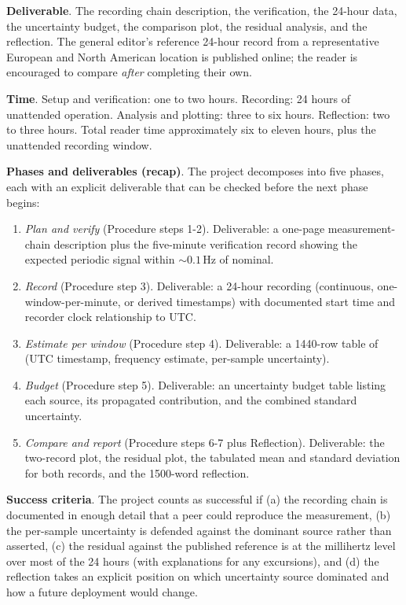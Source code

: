 \begin{project}
\textbf{Deliverable}. The recording chain description, the
verification, the 24-hour data, the uncertainty budget, the
comparison plot, the residual analysis, and the reflection. The
general editor's reference 24-hour record from a representative
European and North American location is published online; the
reader is encouraged to compare \emph{after} completing their own.

\textbf{Time}. Setup and verification: one to two hours. Recording:
24 hours of unattended operation. Analysis and plotting: three to
six hours. Reflection: two to three hours. Total reader time
approximately six to eleven hours, plus the unattended recording
window.

\textbf{Phases and deliverables (recap)}. The project decomposes
into five phases, each with an explicit deliverable that can be
checked before the next phase begins:

\begin{enumerate}[leftmargin=*]
  \item \emph{Plan and verify} (Procedure steps 1-2). Deliverable:
    a one-page measurement-chain description plus the five-minute
    verification record showing the expected periodic signal
    within $\sim 0.1 \,\si{\hertz}$ of nominal.
  \item \emph{Record} (Procedure step 3). Deliverable: a 24-hour
    recording (continuous, one-window-per-minute, or derived
    timestamps) with documented start time and recorder clock
    relationship to UTC.
  \item \emph{Estimate per window} (Procedure step 4). Deliverable:
    a 1440-row table of (UTC timestamp, frequency estimate,
    per-sample uncertainty).
  \item \emph{Budget} (Procedure step 5). Deliverable: an uncertainty
    budget table listing each source, its propagated contribution,
    and the combined standard uncertainty.
  \item \emph{Compare and report} (Procedure steps 6-7 plus
    Reflection). Deliverable: the two-record plot, the residual
    plot, the tabulated mean and standard deviation for both
    records, and the 1500-word reflection.
\end{enumerate}

\textbf{Success criteria}. The project counts as successful if
(a) the recording chain is documented in enough detail that a peer
could reproduce the measurement, (b) the per-sample uncertainty is
defended against the dominant source rather than asserted, (c) the
residual against the published reference is at the millihertz
level over most of the 24 hours (with explanations for any
excursions), and (d) the reflection takes an explicit position on
which uncertainty source dominated and how a future deployment
would change.


\end{project}
